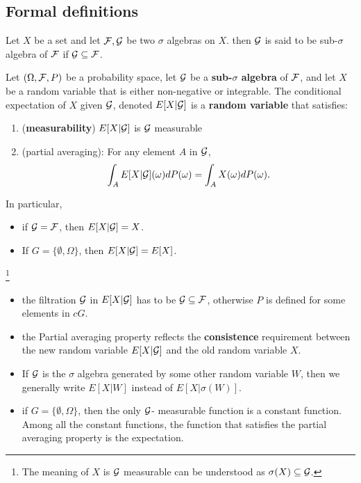 \begin{refsection}
 
\subsection{Formal definitions}

\begin{definition}
Let $X$ be a set and let $\mathcal{F},\mathcal{G}$ be two $\sigma$ algebras on $X$. then $\mathcal{G}$ is said to be sub-$\sigma$ algebra of $\mathcal{F}$ if $\mathcal{G}\subseteq \mathcal{F}$.	
\end{definition}


\begin{definition}\label{ch:theory-of-probability:def:ConditionalExpectationWithRespectToSigmaAlgebra}\cite[68]{shreve2004stochastic2}
Let $(\Omega,\mathcal{F},P)$ be a probability space, let $\mathcal{G}$ be a \textbf{sub-$\sigma$ algebra} of $\mathcal{F}$, and let $X$ be a random variable that is either non-negative or integrable. The conditional expectation of $X$ given $\mathcal{G}$, denoted $E[X|\mathcal{G}]$ is a \textbf{random variable} that satisfies:
\begin{enumerate}
   \item (\textbf{measurability}) $E[X|\mathcal{G}]$ is $\mathcal{G}$ measurable
   \item (partial averaging): For any element $A$ in $\mathcal{G}$,
   $$\int_A E[X|\mathcal{G}](\omega)dP(\omega) = \int_A X(\omega)dP(\omega).$$
\end{enumerate}

In particular, 
\begin{itemize}
	\item if $\mathcal{G} = \mathcal{F}$, then $E[X|\mathcal{G}] = X$.
	\item If  $G = \{\emptyset, \Omega \}$, then $E[X|\mathcal{G}] = E[X]$.
\end{itemize}

\footnote{
	The meaning of $X$ is $\mathcal{G}$ measurable can be understood as $\sigma(X)\subseteq \mathcal{G}$.}
\end{definition}
\begin{remark}\hfill
\begin{itemize}
	\item the filtration $\mathcal{G}$ in $E[X|\mathcal{G}]$ has to be $\mathcal{G}\subseteq \mathcal{F}$, otherwise $P$ is defined for some elements in $cG$. 
    \item the Partial averaging property reflects the \textbf{consistence} requirement between the new random variable $E[X|\mathcal{G}]$ and the old random variable $X$.
    \item If $\mathcal{G}$ is the $\sigma$ algebra generated by some other random variable $W$, then we generally write $E[X|W]$ instead of $E[X|\sigma(W)]$.
    \item if $G = \{\emptyset, \Omega \}$, then the only $\mathcal{G}$- measurable function is a constant function. Among all the constant functions, the function that satisfies the partial averaging property is the expectation. 
\end{itemize}
\end{remark}


\end{refsection}
